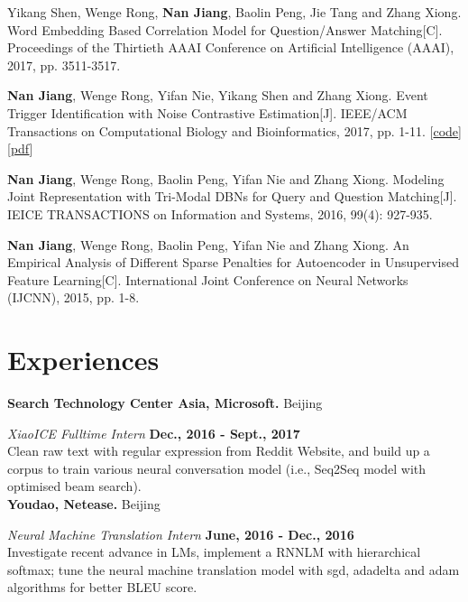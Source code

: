 \documentclass[margin,line]{resume}
\begin{document}
\begin{resume}
Yikang Shen, Wenge Rong, \textbf{Nan Jiang}, Baolin Peng, Jie Tang and Zhang Xiong. Word Embedding Based Correlation Model for Question/Answer Matching[C]. Proceedings of the Thirtieth {AAAI} Conference on Artificial Intelligence (AAAI), 2017, pp. 3511-3517.


\textbf{Nan Jiang}, Wenge Rong, Yifan Nie, Yikang Shen and Zhang Xiong. Event Trigger Identification with Noise Contrastive Estimation[J]. IEEE/ACM Transactions on Computational Biology and Bioinformatics, 2017, pp. 1-11. [\href{https://github.com/jiangnanHugo/mlee-nce}{code}][\href{https://github.com/jiangnanhugo/paper/blob/master/APBC2017/APBC2017.pdf}{pdf}]

\textbf{Nan Jiang}, Wenge Rong, Baolin Peng, Yifan Nie and Zhang Xiong. Modeling Joint Representation with Tri-Modal DBNs for Query and Question Matching[J]. IEICE TRANSACTIONS on Information and Systems, 2016, 99(4): 927-935.

\textbf{Nan Jiang}, Wenge Rong, Baolin Peng, Yifan Nie and Zhang Xiong. An Empirical Analysis of Different Sparse Penalties
for Autoencoder in Unsupervised Feature Learning[C]. International Joint Conference on Neural Networks (IJCNN), 2015, pp. 1-8.




\section{Experiences}
{\bf Search Technology Center Asia, Microsoft.} Beijing

{\em XiaoICE Fulltime Intern} \hfill {\bf Dec., 2016 - Sept., 2017}\\
Clean raw text with regular expression from Reddit Website, and build up a corpus to train various neural conversation model (i.e., Seq2Seq model with optimised beam search).\\


{\bf Youdao, Netease.} Beijing

{\em Neural Machine Translation Intern} \hfill {\bf June, 2016 - Dec., 2016}\\
Investigate recent advance in LMs, implement a RNNLM with hierarchical softmax; tune the neural machine translation model with sgd, adadelta and adam algorithms for better BLEU score.


%







\end{resume}
\end{document}
